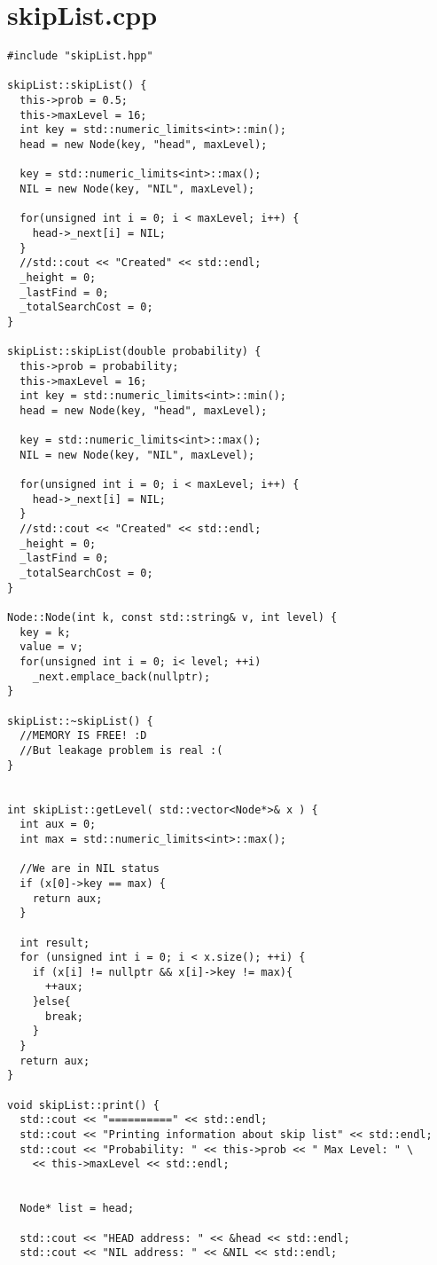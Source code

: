 \section{skipList.cpp}
\begin{lstlisting}[caption=Code from file skipList.cpp, style=myC]
#include "skipList.hpp"

skipList::skipList() {
  this->prob = 0.5;
  this->maxLevel = 16;
  int key = std::numeric_limits<int>::min();
  head = new Node(key, "head", maxLevel);

  key = std::numeric_limits<int>::max();
  NIL = new Node(key, "NIL", maxLevel);

  for(unsigned int i = 0; i < maxLevel; i++) {
    head->_next[i] = NIL;
  }
  //std::cout << "Created" << std::endl;
  _height = 0;
  _lastFind = 0;
  _totalSearchCost = 0;
}

skipList::skipList(double probability) {
  this->prob = probability;
  this->maxLevel = 16;
  int key = std::numeric_limits<int>::min();
  head = new Node(key, "head", maxLevel);

  key = std::numeric_limits<int>::max();
  NIL = new Node(key, "NIL", maxLevel);

  for(unsigned int i = 0; i < maxLevel; i++) {
    head->_next[i] = NIL;
  }
  //std::cout << "Created" << std::endl;
  _height = 0;
  _lastFind = 0;
  _totalSearchCost = 0;
}

Node::Node(int k, const std::string& v, int level) {
  key = k;
  value = v;
  for(unsigned int i = 0; i< level; ++i)
    _next.emplace_back(nullptr);
}

skipList::~skipList() {
  //MEMORY IS FREE! :D
  //But leakage problem is real :(
}


int skipList::getLevel( std::vector<Node*>& x ) {
  int aux = 0;
  int max = std::numeric_limits<int>::max();

  //We are in NIL status
  if (x[0]->key == max) {
    return aux;
  }

  int result;
  for (unsigned int i = 0; i < x.size(); ++i) {
    if (x[i] != nullptr && x[i]->key != max){
      ++aux;
    }else{
      break;
    }
  }
  return aux;
}

void skipList::print() {
  std::cout << "==========" << std::endl;
  std::cout << "Printing information about skip list" << std::endl;
  std::cout << "Probability: " << this->prob << " Max Level: " \
    << this->maxLevel << std::endl;


  Node* list = head;

  std::cout << "HEAD address: " << &head << std::endl;
  std::cout << "NIL address: " << &NIL << std::endl;


\end{lstlisting}
